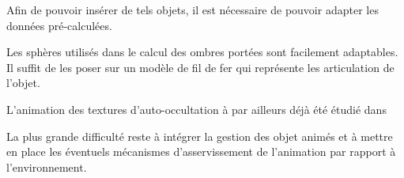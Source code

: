 \documentclass[10pt,a4paper,twoside, twocolumn]{report}
\newcommand*{\rootPath}{../}
\begin{document}
Afin de pouvoir insérer de tels objets, il est nécessaire de pouvoir adapter les données pré-calculées. 

Les sphères utilisés dans le calcul des ombres portées sont facilement adaptables. Il suffit de les poser sur un modèle de fil de fer qui représente les articulation de l’objet.

L’animation des textures d’auto-occultation à par ailleurs déjà été étudié dans \cite{Kontkanen2006}

La plus grande difficulté reste à intégrer la gestion des objet animés et à mettre en place les éventuels mécanismes d’asservissement de l’animation par rapport à l’environnement.

\ifstandalone
	
	
\fi
\end{document}
